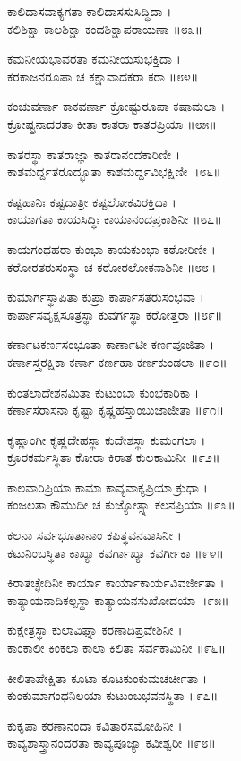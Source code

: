 ಕಾಲಿದಾಸವಾಕ್ಯಗತಾ ಕಾಲಿದಾಸಸುಸಿದ್ಧಿದಾ ।\\
ಕಲಿಶಿಕ್ಷಾ ಕಾಲಶಿಕ್ಷಾ ಕಂದಶಿಕ್ಷಾಪರಾಯಣಾ ॥೮೩॥

ಕಮನೀಯಭಾವರತಾ ಕಮನೀಯಸುಭಕ್ತಿದಾ ।\\
ಕರಕಾಜನರೂಪಾ ಚ ಕಕ್ಷಾವಾದಕರಾ ಕರಾ ॥೮೪॥

ಕಂಚುವರ್ಣಾ ಕಾಕವರ್ಣಾ ಕ್ರೋಷ್ಟುರೂಪಾ ಕಷಾಮಲಾ ।\\
ಕ್ರೋಷ್ಟ್ರನಾದರತಾ ಕೀತಾ ಕಾತರಾ ಕಾತರಪ್ರಿಯಾ ॥೮೫॥

ಕಾತರಸ್ಥಾ ಕಾತರಾಜ್ಞಾ ಕಾತರಾನಂದಕಾರಿಣೀ ।\\
ಕಾಶಮರ್ದ್ದತರೂದ್ಭೂತಾ ಕಾಶಮರ್ದ್ದವಿಭಕ್ಷಿಣೀ ॥೮೬॥

ಕಷ್ಟಹಾನಿಃ ಕಷ್ಟದಾತ್ರೀ ಕಷ್ಟಲೋಕವಿರಕ್ತಿದಾ ।\\
ಕಾಯಾಗತಾ ಕಾಯಸಿದ್ಧಿಃ ಕಾಯಾನಂದಪ್ರಕಾಶಿನೀ ॥೮೭॥

ಕಾಯಗಂಧಹರಾ ಕುಂಭಾ ಕಾಯಕುಂಭಾ ಕಠೋರಿಣೀ ।\\
ಕಠೋರತರುಸಂಸ್ಥಾ ಚ ಕಠೋರಲೋಕನಾಶಿನೀ ॥೮೮॥

ಕುಮಾರ್ಗಸ್ಥಾಪಿತಾ ಕುಪ್ರಾ ಕಾರ್ಪಾಸತರುಸಂಭವಾ ।\\
ಕಾರ್ಪಾಸವೃಕ್ಷಸೂತ್ರಸ್ಥಾ ಕುವರ್ಗಸ್ಥಾ ಕರೋತ್ತರಾ ॥೮೯॥

ಕರ್ಣಾಟಕರ್ಣಸಂಭೂತಾ ಕಾರ್ಣಾಟೀ ಕರ್ಣಪೂಜಿತಾ ।\\
ಕರ್ಣಾಸ್ತ್ರರಕ್ಷಿಕಾ ಕರ್ಣಾ ಕರ್ಣಹಾ ಕರ್ಣಕುಂಡಲಾ ॥೯೦॥

ಕುಂತಲಾದೇಶನಮಿತಾ ಕುಟುಂಬಾ ಕುಂಭಕಾರಿಕಾ ।\\
ಕರ್ಣಾಸರಾಸನಾ ಕೃಷ್ಟಾ ಕೃಷ್ಣಹಸ್ತಾಂಬುಜಾಜೀತಾ ॥೯೧॥

ಕೃಷ್ಣಾಂಗೀ ಕೃಷ್ಣದೇಹಸ್ಥಾ ಕುದೇಶಸ್ಥಾ ಕುಮಂಗಲಾ ।\\
ಕ್ರೂರಕರ್ಮಸ್ಥಿತಾ ಕೋರಾ ಕಿರಾತ ಕುಲಕಾಮಿನೀ ॥೯೨॥

ಕಾಲವಾರಿಪ್ರಿಯಾ ಕಾಮಾ ಕಾವ್ಯವಾಕ್ಯಪ್ರಿಯಾ ಕ್ರುಧಾ ।\\
ಕಂಜಲತಾ ಕೌಮುದೀ ಚ ಕುಜ್ಯೋತ್ಸ್ನಾ ಕಲನಪ್ರಿಯಾ ॥೯೩॥

ಕಲನಾ ಸರ್ವಭೂತಾನಾಂ ಕಪಿತ್ಥವನವಾಸಿನೀ ।\\
ಕಟುನಿಂಬಸ್ಥಿತಾ ಕಾಖ್ಯಾ ಕವರ್ಗಾಖ್ಯಾ ಕವರ್ಗೀಕಾ ॥೯೪॥

ಕಿರಾತಚ್ಛೇದಿನೀ ಕಾರ್ಯಾ ಕಾರ್ಯಾಕಾರ್ಯವಿವರ್ಜೀತಾ ।\\
ಕಾತ್ಯಾಯನಾದಿಕಲ್ಪಸ್ಥಾ ಕಾತ್ಯಾಯನಸುಖೋದಯಾ ॥೯೫॥

ಕುಕ್ಷೇತ್ರಸ್ಥಾ ಕುಲಾವಿಘ್ನಾ ಕರಣಾದಿಪ್ರವೇಶಿನೀ ।\\
ಕಾಂಕಾಲೀ ಕಿಂಕಲಾ ಕಾಲಾ ಕಿಲಿತಾ ಸರ್ವಕಾಮಿನೀ ॥೯೬॥

ಕೀಲಿತಾಪೇಕ್ಷಿತಾ ಕೂಟಾ ಕೂಟಕುಂಕುಮಚರ್ಚೀತಾ ।\\
ಕುಂಕುಮಾಗಂಧನಿಲಯಾ ಕುಟುಂಬಭವನಸ್ಥಿತಾ ॥೯೭॥

ಕುಕೃಪಾ ಕರಣಾನಂದಾ ಕವಿತಾರಸಮೋಹಿನೀ ।\\
ಕಾವ್ಯಶಾಸ್ತ್ರಾನಂದರತಾ ಕಾವ್ಯಪೂಜ್ಯಾ ಕವೀಶ್ವರೀ ॥೯೮॥

